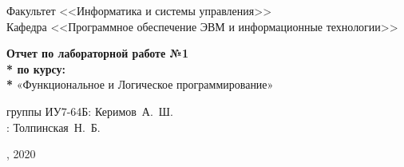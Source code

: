 \begin{titlepage}
\vspace{2em}

\hrulefill

\begin{center}
 	\vspace{0pt plus2fill} %
	{\large
	Факультет  <<Информатика и системы управления>>\\
	Кафедра  <<Программное обеспечение ЭВМ и информационные технологии>>
	}
\end{center}

{\Large
\begin{center}
	\textbf{Отчет по лабораторной работе №1 \\* по курсу: \\* } «Функциональное и Логическое программирование» \\
\end{center}
}
%
\vspace{0pt plus4fill} %

\begin{center}
\newlength{\ML}
 группы ИУ7-64Б:\hspace{0.2cm} Керимов~А.~Ш.\\
:\hspace{0.2cm} Толпинская~Н.~Б.\\

\end{center}
%

\vspace{0pt plus4fill} %
{, 2020\par}
\end{titlepage}